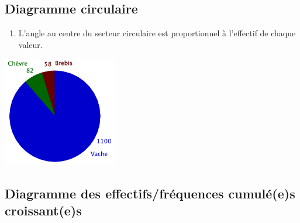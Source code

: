\subsection{Diagramme circulaire}

\begin{multicols}{2}
  \begin{enumerate}
  \item L'angle au centre du secteur circulaire est proportionnel à l'effectif
    de chaque valeur.
  \end{enumerate}
  
  
  \columnbreak
  \begin{minipage}{1.0\linewidth}
    \vspace{-2em}
    \begin{center}
      \includegraphics[width=5cm]{Stats_Fig4_DiagCirc.png}
    \end{center}    
  \end{minipage}
\end{multicols}



\subsection{Diagramme des effectifs/fréquences cumulé(e)s croissant(e)s}

